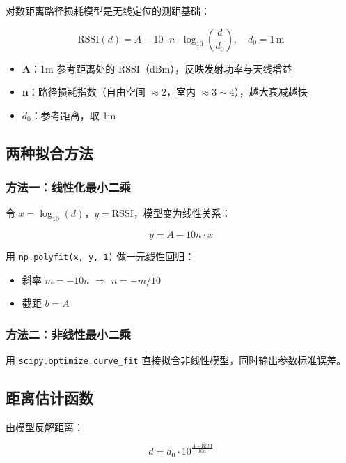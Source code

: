 \documentclass[11pt,a4paper]{article}
\newcommand{\code}[1]{\texttt{#1}}
\begin{document}
对数距离路径损耗模型是无线定位的测距基础：

\begin{equation}
\boxed{\text{RSSI}(d) = A - 10 \cdot n \cdot \log_{10}\left(\frac{d}{d_0}\right), \quad d_0 = 1\,\text{m}}
\end{equation}

\begin{itemize}
    \item \textbf{A}：1m 参考距离处的 RSSI（dBm），反映发射功率与天线增益
    \item \textbf{n}：路径损耗指数（自由空间 $\approx 2$，室内 $\approx 3 \sim 4$），越大衰减越快
    \item \textbf{$d_0$}：参考距离，取 1m
\end{itemize}

\subsection{两种拟合方法}

\subsubsection*{方法一：线性化最小二乘}

令 $x = \log_{10}(d)$，$y = \text{RSSI}$，模型变为线性关系：

$$y = A - 10n \cdot x$$

用 \code{np.polyfit(x, y, 1)} 做一元线性回归：
\begin{itemize}
    \item 斜率 $m = -10n$ $\Rightarrow$ $n = -m/10$
    \item 截距 $b = A$
\end{itemize}

\subsubsection*{方法二：非线性最小二乘}

用 \code{scipy.optimize.curve\_fit} 直接拟合非线性模型，同时输出参数标准误差。

\subsection{距离估计函数}

由模型反解距离：

\begin{equation}
\boxed{d = d_0 \cdot 10^{\frac{A - \text{RSSI}}{10n}}}
\end{equation}
\end{document}
